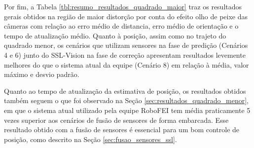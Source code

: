 \documentclass[acronym, symbols, table]{fei}
\begin{document}
		Por fim, a Tabela \ref{tbl:resumo_resultados_quadrado_maior} traz os resultados gerais obtidos na região de maior distorção por conta do efeito olho de peixe das câmeras com relação ao erro médio de distancia, erro médio de orientação e o tempo de atualização médio. Quanto à posição, assim como no trajeto do quadrado menor, os cenários que utilizam sensores na fase de predição (Cenários 4 e 6) junto do SSL-Vision na fase de correção apresentam resultados levemente melhores do que o sistema atual da equipe (Cenário 8) em relação à média, valor máximo e desvio padrão.
		
		Quanto ao tempo de atualização da estimativa de posição, os resultados obtidos também seguem o que foi observado na Seção \ref{sec:resultados_quadrado_menor}, em que o sistema atual utilizado pela equipe RoboFEI tem média praticamente 5 vezes superior aos cenários de fusão de sensores de forma embarcada. Esse resultado obtido com a fusão de sensores é essencial para um bom controle de posição, como descrito na Seção \ref{sec:fusao_sensores_ssl}.
	
\end{document}
